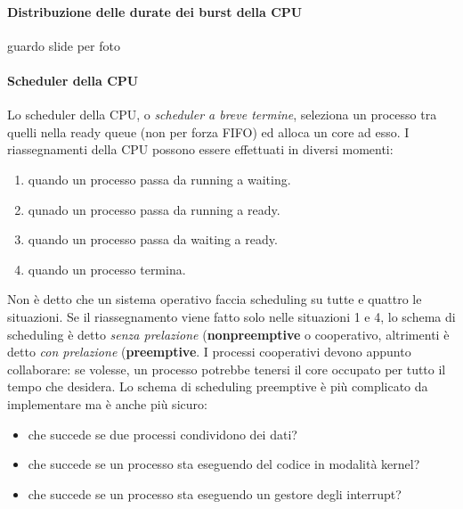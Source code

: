 \documentclass[11pt]{article}
\begin{document}
\paragraph{Distribuzione delle durate dei burst della CPU}
guardo slide per foto

\paragraph{Scheduler della CPU} Lo scheduler della CPU, o \textit{scheduler a breve termine}, seleziona un processo tra quelli nella ready queue (non per forza FIFO) ed alloca un core ad esso.
I riassegnamenti della CPU possono essere effettuati  in diversi momenti:
\begin{enumerate}
	\item quando un processo passa da running a waiting.
	\item qunado un processo passa da running a ready.
	\item quando un processo passa da waiting a ready.
	\item quando un processo termina.
\end{enumerate}
Non è detto che un sistema operativo faccia scheduling su tutte e quattro le situazioni.
Se il riassegnamento viene fatto solo nelle situazioni 1 e 4, lo schema di scheduling è detto \textit{senza prelazione} (\textbf{nonpreemptive} o cooperativo, altrimenti è detto \textit{con prelazione} (\textbf{preemptive}.
I processi cooperativi devono appunto collaborare: se volesse, un processo potrebbe tenersi il core occupato per tutto il tempo che desidera.
Lo schema di scheduling preemptive è più complicato da implementare ma è anche più sicuro:
\begin{itemize}
	\item che succede se due processi condividono dei dati?
	\item che succede se un processo sta eseguendo del codice in modalità kernel?
	\item che succede se un processo sta eseguendo un gestore degli interrupt?
\end{itemize}
\end{document}

